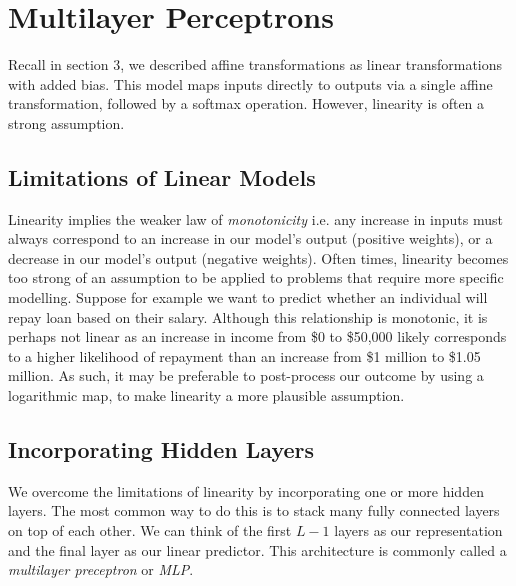 \documentclass[a4paper,12pt]{article}
\theoremstyle{definition}
\begin{document}
\section{Multilayer Perceptrons}
Recall in section 3, we described affine transformations as linear transformations with added bias. This model maps inputs directly to
outputs via a single affine transformation, followed by a softmax operation. However, linearity is often a strong assumption.
    \subsection*{Limitations of Linear Models}
    Linearity implies the weaker law of \textit{monotonicity} i.e. any increase in inputs must always correspond to an increase in our model's 
    output (positive weights), or a decrease in our model's output (negative weights). Often times, linearity becomes too strong of an assumption
    to be applied to problems that require more specific modelling. Suppose for example we want to predict whether an individual will repay loan
    based on their salary. Although this relationship is monotonic, it is perhaps not linear as an increase in income from \$0 to \$50,000 likely
    corresponds to a higher likelihood of repayment than an increase from \$1 million to \$1.05 million. As such, it may be preferable to
    post-process our outcome by using a logarithmic map, to make linearity a more plausible assumption.
    \subsection*{Incorporating Hidden Layers}
    We overcome the limitations of linearity by incorporating one or more hidden layers. The most common way to do this is to stack many fully
    connected layers on top of each other. We can think of the first $L-1$ layers as our representation and the final layer as our linear predictor.
    This architecture is commonly called a \textit{multilayer preceptron} or \textit{MLP}.
\end{document}
